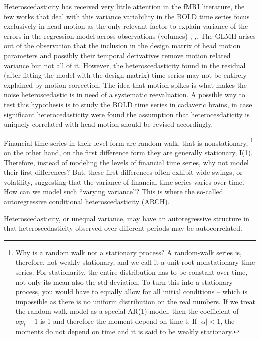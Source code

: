 \documentclass[10pt,letterpaper]{article}
\begin{document}
Heteroscedasticity has received very little attention in the fMRI literature, the few works that deal with this variance variability in the BOLD time series focus exclusively in head motion as the only relevant factor to explain variance of the errors in the regression model across observations (volumes) \citep{luo2003diagnosis}, \citep{diedrichsen2005detecting},\citep{eklund2017bayesian}. 
The GLMH arises out of the observation that the inclusion in the design matrix of head motion parameters and possibly their temporal derivatives remove motion related variance but not all of it. However, the heteroscedasticity found in the residual (after fitting the model with the design matrix) time series may not be entirely explained by motion correction. The idea that motion spikes is what makes the noise heteroscedastic is in need of a systematic reevaluation. A possible way to test this hypothesis is to study the BOLD time series in cadaveric brains, in case significant heterocedasticity were found the assumption that heterocesdaticity is uniquely correlated with head motion should be revised accordingly.


Financial time series in their level form are random walk, that is nonstationary, \footnote{Why is a random walk not a stationary process? A random-walk series is, therefore, not weakly stationary, and we call it a unit-root nonstationary time series. For stationarity, the entire distribution has to be constant over time, not only its mean also the std deviation. To turn this into a stationary process, you would have to equally allow for all initial conditions – which is impossible as there is no uniform distribution on the real numbers.  If we treat the random-walk model as a special AR(1) model, then the coefficient of $\alpha p_t−1$ is 1 and therefore the moment depend on time t. If $|\alpha| < 1$, the moments do not depend on time and it is said to be weakly stationary.}
on the other hand, on the first difference form they are generally stationary, I(1). Therefore, instead of modeling the levels of financial time series, why not model their first differences? But, these first differences often exhibit wide swings, or volatility, suggesting that the variance of financial time series varies over time. How can we model such “varying variance”? This is where the so-called autoregressive conditional heteroscedasticity (ARCH).

Heteroscedasticity, or unequal variance, may have an autoregressive structure in that heteroscedasticity observed over different periods may be autocorrelated. 
\end{document}
